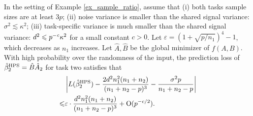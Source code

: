\begin{corollary}\label{cor_MTL_loss}
	In the setting of Example \ref{ex_sample_ratio}, assume that
	(i) both tasks sample sizes are at least $3p$;
	(ii) noise variance is smaller than the shared signal variance: $\sigma^2 \lesssim  \kappa^2$;
	(iii) task-specific variance is much smaller than the shared signal variance: $d^2 \leqslant p^{-{\mathit{c}}}{\kappa^2}$ for a small constant $c>0$.
	Let $\varepsilon = (1 + \sqrt{p/n_1})^ 4 - 1$, which decreases as $n_1$ increases.
	Let $\hat{A},\hat{B}$ be the global minimizer of $f(A, B)$.
	With high probability over the randomness of the input,
	the prediction loss of $\hat{\beta}_2^{\textup{HPS}} = \hat{B} \hat{A}_2$ for task two satisfies that
	\begin{align}
	  & \left|L(\hat{\beta}_2^{\textup{HPS}}) - \frac{2d^2 n_1^2 (n_1 + n_2)}{(n_1 + n_2 - p)^3} -\frac{\sigma^2 p}{n_1 + n_2 - p}  \right| \nonumber\\
	\leqslant& \varepsilon \cdot \frac{d^2 n_1^2 (n_1 + n_2)}{(n_1 + n_2 - p)^3} +  \operatorname{O}(p^{-c/2}).\label{cor_MTL_error}
	 \end{align}
	 \end{corollary}

